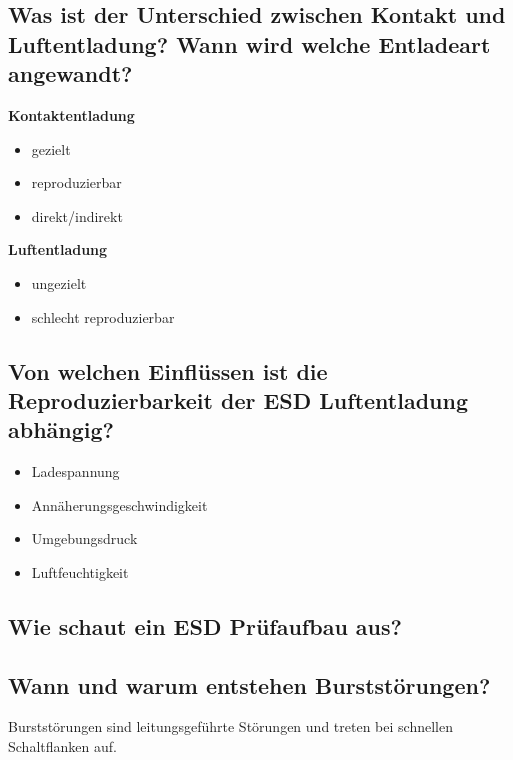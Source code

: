 \subsection{Was ist der Unterschied zwischen Kontakt und Luftentladung? Wann wird welche Entladeart angewandt?}
\textbf{Kontaktentladung}
%
\begin{itemize}
  \item gezielt
  \item reproduzierbar
  \item direkt/indirekt
\end{itemize}
%
\textbf{Luftentladung}
%
\begin{itemize}
  \item ungezielt
  \item schlecht reproduzierbar
\end{itemize}

\subsection{Von welchen Einflüssen ist die Reproduzierbarkeit der ESD Luftentladung abhängig?}
\begin{itemize}
  \item Ladespannung
  \item Annäherungsgeschwindigkeit
  \item Umgebungsdruck
  \item Luftfeuchtigkeit
\end{itemize}

\subsection{Wie schaut ein ESD Prüfaufbau aus?}

\subsection{Wann und warum entstehen Burststörungen?}
Burststörungen sind leitungsgeführte Störungen und treten bei schnellen Schaltflanken auf. 

